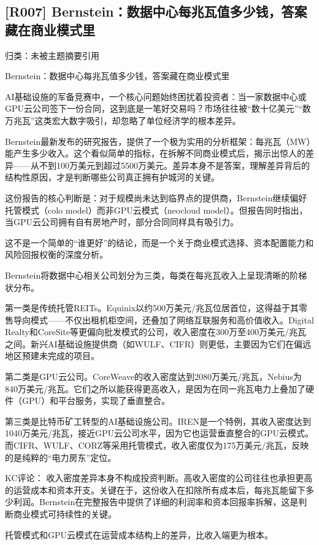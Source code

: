 \documentclass[11pt]{ctexart}
\begin{document}
\subsection{[R007] Bernstein：数据中心每兆瓦值多少钱，答案藏在商业模式里}
{\small\color{refgray}归类：未被主题摘要引用}

Bernstein：数据中心每兆瓦值多少钱，答案藏在商业模式里

AI基础设施的军备竞赛中，一个核心问题始终困扰着投资者：当一家数据中心或GPU云公司签下一份合同，这到底是一笔好交易吗？市场往往被“数十亿美元”“数万兆瓦”这类宏大数字吸引，却忽略了单位经济学的根本差异。

Bernstein最新发布的研究报告，提供了一个极为实用的分析框架：每兆瓦（MW）能产生多少收入。这个看似简单的指标，在拆解不同商业模式后，揭示出惊人的差异——从不到100万美元到超过5500万美元。差异本身不是答案，理解差异背后的结构性原因，才是判断哪些公司真正拥有护城河的关键。

这份报告的核心判断是：对于规模尚未达到临界点的提供商，Bernstein继续偏好托管模式（colo model）而非GPU云模式（neocloud model）。但报告同时指出，当GPU云公司拥有自有房地产时，部分合同同样具有吸引力。

这不是一个简单的“谁更好”的结论，而是一个关于商业模式选择、资本配置能力和风险回报权衡的深度分析。

Bernstein将数据中心相关公司划分为三类，每类在每兆瓦收入上呈现清晰的阶梯状分布。

第一类是传统托管REITs。Equinix以约500万美元/兆瓦位居首位，这得益于其零售导向模式——不仅出租机柜空间，还叠加了网络互联服务和高价值收入。Digital Realty和CoreSite等更偏向批发模式的公司，收入密度在300万至400万美元/兆瓦之间。新兴AI基础设施提供商（如WULF、CIFR）则更低，主要因为它们在偏远地区预建未完成的项目。

第二类是GPU云公司。CoreWeave的收入密度达到2080万美元/兆瓦，Nebius为840万美元/兆瓦。它们之所以能获得更高收入，是因为在同一兆瓦电力上叠加了硬件（GPU）和平台服务，实现了垂直整合。

第三类是比特币矿工转型的AI基础设施公司。IREN是一个特例，其收入密度达到1040万美元/兆瓦，接近GPU云公司水平，因为它也运营垂直整合的GPU云模式。而CIFR、WULF、CORZ等采用托管模式，收入密度仅为175万美元/兆瓦，反映的是纯粹的“电力房东”定位。

KC评论： 收入密度差异本身不构成投资判断。高收入密度的公司往往也承担更高的运营成本和资本开支。关键在于，这份收入在扣除所有成本后，每兆瓦能留下多少利润。Bernstein在完整报告中提供了详细的利润率和资本回报率拆解，这是判断商业模式可持续性的关键。

托管模式和GPU云模式在运营成本结构上的差异，比收入端更为根本。
\end{document}
